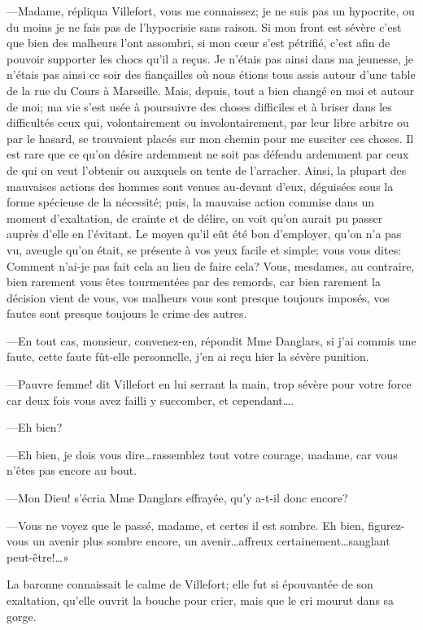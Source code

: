 —Madame, répliqua Villefort, vous me connaissez; je ne suis pas un hypocrite, ou du moins je ne fais pas de l'hypocrisie sans raison. Si mon front est sévère c'est que bien des malheurs l'ont assombri, si mon cœur s'est pétrifié, c'est afin de pouvoir supporter les chocs qu'il a reçus. Je n'étais pas ainsi dans ma jeunesse, je n'étais pas ainsi ce soir des fiançailles où nous étions tous assis autour d'une table de la rue du Cours à Marseille. Mais, depuis, tout a bien changé en moi et autour de moi; ma vie s'est usée à poursuivre des choses difficiles et à briser dans les difficultés ceux qui, volontairement ou involontairement, par leur libre arbitre ou par le hasard, se trouvaient placés sur mon chemin pour me susciter ces choses. Il est rare que ce qu'on désire ardemment ne soit pas défendu ardemment par ceux de qui on veut l'obtenir ou auxquels on tente de l'arracher. Ainsi, la plupart des mauvaises actions des hommes sont venues au-devant d'eux, déguisées sous la forme spécieuse de la nécessité; puis, la mauvaise action commise dans un moment d'exaltation, de crainte et de délire, on voit qu'on aurait pu passer auprès d'elle en l'évitant. Le moyen qu'il eût été bon d'employer, qu'on n'a pas vu, aveugle qu'on était, se présente à vos yeux facile et simple; vous vous dites: Comment n'ai-je pas fait cela au lieu de faire cela? Vous, mesdames, au contraire, bien rarement vous êtes tourmentées par des remords, car bien rarement la décision vient de vous, vos malheurs vous sont presque toujours imposés, vos fautes sont presque toujours le crime des autres. 

—En tout cas, monsieur, convenez-en, répondit Mme Danglars, si j'ai commis une faute, cette faute fût-elle personnelle, j'en ai reçu hier la sévère punition. 

—Pauvre femme! dit Villefort en lui serrant la main, trop sévère pour votre force car deux fois vous avez failli y succomber, et cependant\dots. 

—Eh bien? 

—Eh bien, je dois vous dire\dots rassemblez tout votre courage, madame, car vous n'êtes pas encore au bout. 

—Mon Dieu! s'écria Mme Danglars effrayée, qu'y a-t-il donc encore? 

—Vous ne voyez que le passé, madame, et certes il est sombre. Eh bien, figurez-vous un avenir plus sombre encore, un avenir\dots affreux certainement\dots sanglant peut-être!\dots» 

La baronne connaissait le calme de Villefort; elle fut si épouvantée de son exaltation, qu'elle ouvrit la bouche pour crier, mais que le cri mourut dans sa gorge. 

